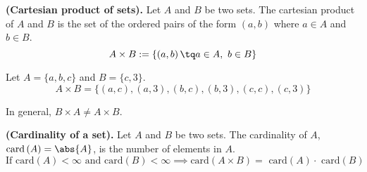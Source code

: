 
\begin{definition}
    \textbf{(Cartesian product of sets).} Let $A$ and $B$ be two sets. The cartesian product of $A$ and $B$ is the set of the ordered pairs of the form $\left( a, b \right)$ where $a\in A$ and $b\in B$.
    \begin{equation}
        A\times B := \{\left( a, b \right) \tq a\in A,\ b\in B\} 
    \end{equation}
\end{definition}

\begin{example}
Let $A = \{a, b, c\} $ and $B = \{c, 3\} $.
    \begin{equation}
        A\times B = \{\left( a, c \right), \left( a, 3 \right), \left( b, c \right), \left( b, 3 \right), \left( c, c \right), \left( c, 3 \right)\}
    \end{equation}
\end{example}
\begin{note}
    In general, $B\times A\neq A\times B$.
\end{note}

\begin{definition}
    \textbf{(Cardinality of a set).} Let $A$ and $B$ be two sets. The cardinality of $A$, $\textrm{card}\left( A \right) = \abs{A}$, is the number of elements in $A$.
    \begin{equation}
        \textrm{If card}\left( A \right) < \infty\textrm{ and } \textrm{card}\left( B \right) < \infty \implies \textrm{card}\left( A\times B \right) = \textrm{ card}\left( A \right)\cdot \textrm{ card}\left( B \right)   
    \end{equation}
\end{definition}

